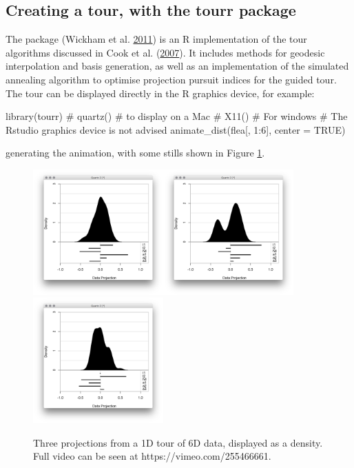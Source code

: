 \subsection{Creating a tour, with the tourr
package}\label{creating-a-tour-with-the-tourr-package}

The  package (Wickham et al.
\protect\hyperlink{ref-tourr}{2011}) is an R implementation of the tour
algorithms discussed in Cook et al.
(\protect\hyperlink{ref-gt_pp_mc}{2007}). It includes methods for
geodesic interpolation and basis generation, as well as an
implementation of the simulated annealing algorithm to optimise
projection pursuit indices for the guided tour. The tour can be
displayed directly in the R graphics device, for example:

\begin{Schunk}
\begin{Sinput}
library(tourr)
# quartz() # to display on a Mac
# X11() # For windows
# The Rstudio graphics device is not advised
animate_dist(flea[, 1:6], center = TRUE)
\end{Sinput}
\end{Schunk}

generating the animation, with some stills shown in Figure \ref{tour}.

\begin{figure}[ht]
\centerline{\includegraphics[width=5cm]{figures/tour1.png}\includegraphics[width=5cm]{figures/tour2.png}\includegraphics[width=5cm]{figures/tour3.png}}
\caption{Three projections from a 1D tour of 6D data, displayed as a density. Full video can be seen at https://vimeo.com/255466661.}
\label{tour}
\end{figure}

